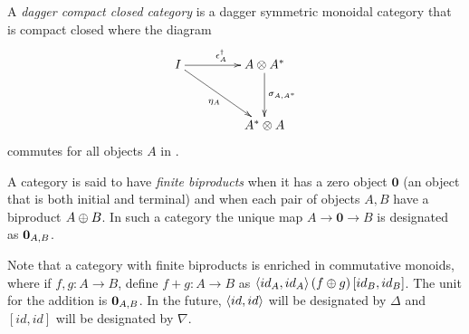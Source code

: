 \begin{definition}\label{def:daggercompact}
  A \emph{dagger compact closed category} \cD{} is a dagger symmetric monoidal category
  that is compact closed where the diagram
  \[
    \xymatrix @C+20pt @R+10pt{
      I \ar[r]^{\epsilon^{\dagger}_{A}} \ar[dr]_{\eta_{A}} &A\*A^{*}\ar[d]^{\sigma_{A,A^{*}}}\\
      &A^{*}\* A
    }
  \]
  commutes for all  objects $A$ in \cD.
\end{definition}

A category \cD{} is said to have \emph{finite biproducts} when it has a zero object $\mathbf{0}$
(an object that is both initial and terminal) and when each pair of objects $A,B$ have a biproduct
$A\oplus B$. In such a category the unique map $A\to \mathbf{0} \to B$ is designated as $\mathbf{0}_{A,B}$.

Note that a category with finite biproducts is enriched in commutative monoids, where if $f,g:A\to
B$, define $f+g:A\to B$ as $\langle id_{A}, id_{A}\rangle\, (f\oplus g)\, [id_{B},id_{B}]$. The unit for the
addition is $\mathbf{0}_{A,B}$. In the future, $\langle id, id\rangle$ will be designated by $\Delta$ and
$[id,id]$ will be designated by $\nabla$.

